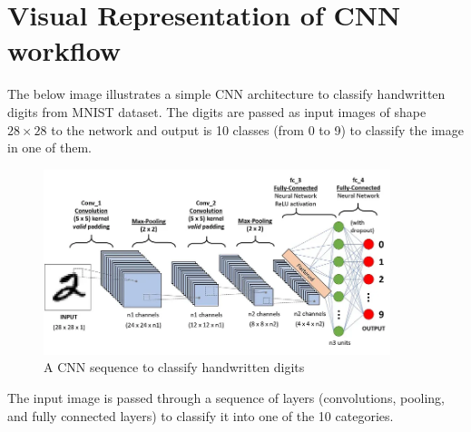\section{Visual Representation of CNN workflow}

The below image illustrates a simple CNN architecture to classify handwritten digits from MNIST dataset. The digits are passed as input images of shape $28 \times 28$ to the network and output is 10 classes (from 0 to 9) to classify the image in one of them.


\newpage
\begin{figure}[h!]
    \centering
    \includegraphics[width=0.9\textwidth]{images/figure3.png}
    \caption{A CNN sequence to classify handwritten digits}
    \label{fig:3}
\end{figure}

The input image is passed through a sequence of layers (convolutions, pooling, and fully connected layers) to classify it into one of the 10 categories.


